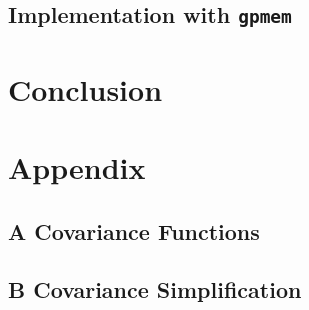 \documentclass[twoside,11pt]{article}
\newcommand{\gpmem}{\texttt{gpmem}}
\begin{document}
\subsection{Implementation with \gpmem}

\section{Conclusion}


\section*{Appendix}
\subsection*{A Covariance Functions}


\subsection*{B Covariance Simplification}


\newpage


\end{document}

